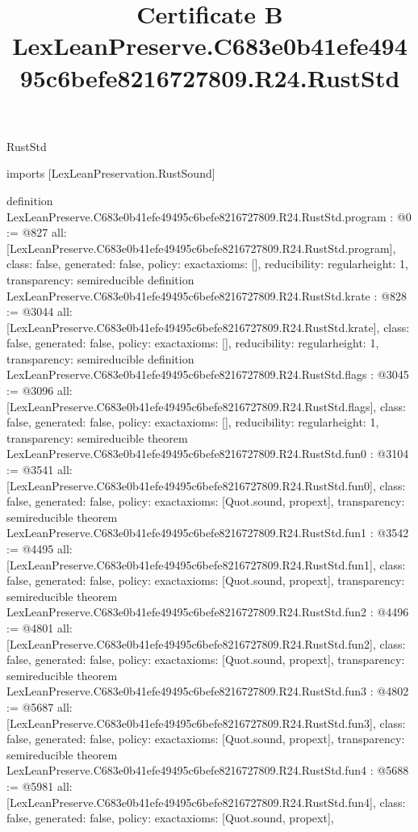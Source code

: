 \begin{lexlean}{RustStd}
\title{Certificate B LexLeanPreserve.C683e0b41efe49495c6befe8216727809.R24.RustStd}
\begin{coremodule}
imports [LexLeanPreservation.RustSound]

definition LexLeanPreserve.C683e0b41efe49495c6befe8216727809.R24.RustStd.program : @0 := @827 {
  all: [LexLeanPreserve.C683e0b41efe49495c6befe8216727809.R24.RustStd.program],
  class: false,
  generated: false,
  policy: exact{axioms: []},
  reducibility: regular{height: 1},
  transparency: semireducible
}
definition LexLeanPreserve.C683e0b41efe49495c6befe8216727809.R24.RustStd.krate : @828 := @3044 {
  all: [LexLeanPreserve.C683e0b41efe49495c6befe8216727809.R24.RustStd.krate],
  class: false,
  generated: false,
  policy: exact{axioms: []},
  reducibility: regular{height: 1},
  transparency: semireducible
}
definition LexLeanPreserve.C683e0b41efe49495c6befe8216727809.R24.RustStd.flags : @3045 := @3096 {
  all: [LexLeanPreserve.C683e0b41efe49495c6befe8216727809.R24.RustStd.flags],
  class: false,
  generated: false,
  policy: exact{axioms: []},
  reducibility: regular{height: 1},
  transparency: semireducible
}
theorem LexLeanPreserve.C683e0b41efe49495c6befe8216727809.R24.RustStd.fun0 : @3104 := @3541 {
  all: [LexLeanPreserve.C683e0b41efe49495c6befe8216727809.R24.RustStd.fun0],
  class: false,
  generated: false,
  policy: exact{axioms: [Quot.sound, propext]},
  transparency: semireducible
}
theorem LexLeanPreserve.C683e0b41efe49495c6befe8216727809.R24.RustStd.fun1 : @3542 := @4495 {
  all: [LexLeanPreserve.C683e0b41efe49495c6befe8216727809.R24.RustStd.fun1],
  class: false,
  generated: false,
  policy: exact{axioms: [Quot.sound, propext]},
  transparency: semireducible
}
theorem LexLeanPreserve.C683e0b41efe49495c6befe8216727809.R24.RustStd.fun2 : @4496 := @4801 {
  all: [LexLeanPreserve.C683e0b41efe49495c6befe8216727809.R24.RustStd.fun2],
  class: false,
  generated: false,
  policy: exact{axioms: [Quot.sound, propext]},
  transparency: semireducible
}
theorem LexLeanPreserve.C683e0b41efe49495c6befe8216727809.R24.RustStd.fun3 : @4802 := @5687 {
  all: [LexLeanPreserve.C683e0b41efe49495c6befe8216727809.R24.RustStd.fun3],
  class: false,
  generated: false,
  policy: exact{axioms: [Quot.sound, propext]},
  transparency: semireducible
}
theorem LexLeanPreserve.C683e0b41efe49495c6befe8216727809.R24.RustStd.fun4 : @5688 := @5981 {
  all: [LexLeanPreserve.C683e0b41efe49495c6befe8216727809.R24.RustStd.fun4],
  class: false,
  generated: false,
  policy: exact{axioms: [Quot.sound, propext]},
}
\end{coremodule}
\end{lexlean}
